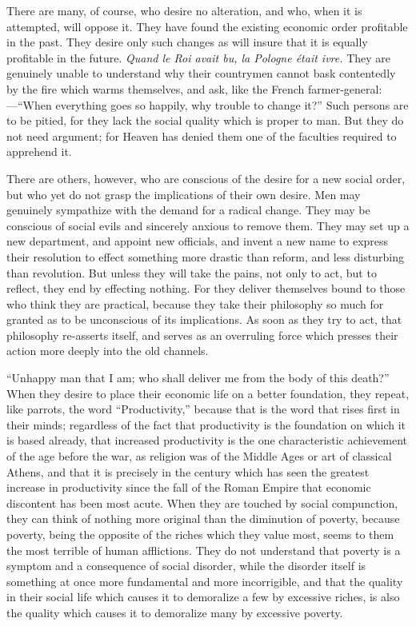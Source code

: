 \documentclass{book}
\begin{document}
There are many, of course, who desire no alteration, and who, when it is attempted, will oppose it. They have found the existing economic order profitable in the past. They desire only such changes as will insure that it is equally profitable in the future. \emph{Quand le Roi avait bu, la Pologne était ivre.} They are genuinely unable to understand why their countrymen cannot bask contentedly by the fire which warms themselves, and ask, like the French farmer-general:—“When everything goes so happily, why trouble to change it?” Such persons are to be pitied, for they lack the social quality which is proper to man. But they do not need argument; for Heaven has denied them one of the faculties required to apprehend it.

There are others, however, who are conscious of the desire for a new social order, but who yet do not grasp the implications of their own desire. Men may genuinely sympathize with the demand for a radical change. They may be conscious of social evils and sincerely anxious to remove them. They may set up a new department, and appoint new officials, and invent a new name to express their resolution to effect something more drastic than reform, and less disturbing than revolution. But unless they will take the pains, not only to act, but to reflect, they end by effecting nothing. For they deliver themselves bound to those who think they are practical, because they take their philosophy so much for granted as to be unconscious of its implications. As soon as they try to act, that philosophy re-asserts itself, and serves as an overruling force which presses their action more deeply into the old channels.

“Unhappy man that I am; who shall deliver me from the body of this death?” When they desire to place their economic life on a better foundation, they repeat, like parrots, the word “Productivity,” because that is the word that rises first in their minds; regardless of the fact that productivity is the foundation on which it is based already, that increased productivity is the one characteristic achievement of the age before the war, as religion was of the Middle Ages or art of classical Athens, and that it is precisely in the century which has seen the greatest increase in productivity since the fall of the Roman Empire that economic discontent has been most acute. When they are touched by social compunction, they can think of nothing more original than the diminution of poverty, because poverty, being the opposite of the riches which they value most, seems to them the most terrible of human afflictions. They do not understand that poverty is a symptom and a consequence of social disorder, while the disorder itself is something at once more fundamental and more incorrigible, and that the quality in their social life which causes it to demoralize a few by excessive riches, is also the quality which causes it to demoralize many by excessive poverty.
\end{document}

